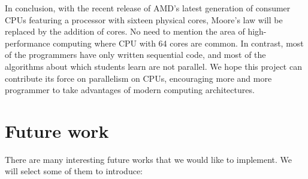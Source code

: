 In conclusion, with the recent release of AMD's latest generation of consumer CPUs featuring a processor with sixteen physical cores, Moore's law will be replaced by the addition of cores. No need to mention the area of high-performance computing where CPU with 64 cores are common. In contrast, most of the programmers have only written sequential code, and most of the algorithms about which students learn are not parallel. We hope this project can contribute its force on parallelism on CPUs, encouraging more and more programmer to take advantages of modern computing architectures.
\section{Future work}
There are many interesting future works that we would like to implement. We will select some of them to introduce:
